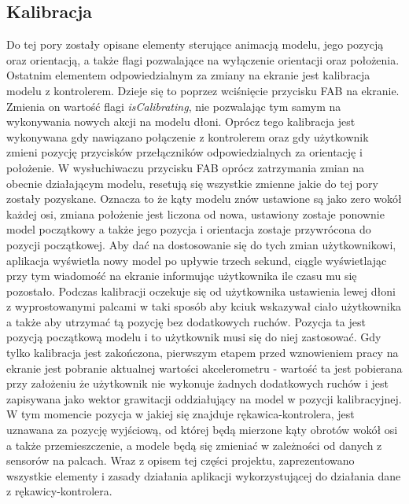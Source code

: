 	\subsection{Kalibracja}
	\label{subsec:kalibracja}
	Do tej pory zostały opisane elementy sterujące animacją modelu, jego pozycją oraz orientacją, a także flagi pozwalające na wyłączenie orientacji oraz położenia. Ostatnim elementem odpowiedzialnym za zmiany na ekranie jest kalibracja modelu z kontrolerem. Dzieje się to poprzez wciśnięcie przycisku FAB na ekranie. Zmienia on wartość flagi \textit{isCalibrating}, nie pozwalając tym samym na wykonywania nowych akcji na modelu dłoni. Oprócz tego kalibracja jest wykonywana gdy nawiązano połączenie z kontrolerem oraz gdy użytkownik zmieni pozycję przycisków przełączników odpowiedzialnych za orientację i położenie. W wysłuchiwaczu przycisku FAB oprócz zatrzymania zmian na obecnie działającym modelu, resetują się wszystkie zmienne jakie do tej pory zostały pozyskane. Oznacza to że kąty modelu znów ustawione są jako zero wokół każdej osi, zmiana położenie jest liczona od nowa, ustawiony zostaje ponownie model początkowy a także jego pozycja i orientacja zostaje przywrócona do pozycji początkowej. Aby dać na dostosowanie się do tych zmian użytkownikowi, aplikacja wyświetla nowy model po upływie trzech sekund, ciągle wyświetlając przy tym wiadomość na ekranie informując użytkownika ile czasu mu się pozostało. Podczas kalibracji oczekuje się od użytkownika ustawienia lewej dłoni z wyprostowanymi palcami w taki sposób aby kciuk wskazywał ciało użytkownika a także aby utrzymać tą pozycję bez dodatkowych ruchów. Pozycja ta jest pozycją początkową modelu i to użytkownik musi się do niej zastosować. Gdy tylko kalibracja jest zakończona, pierwszym etapem przed wznowieniem pracy na ekranie jest pobranie aktualnej wartości akcelerometru - wartość ta jest pobierana przy założeniu że użytkownik nie wykonuje żadnych dodatkowych ruchów i jest zapisywana jako wektor grawitacji oddziałujący na model w pozycji kalibracyjnej. W tym momencie pozycja w jakiej się znajduje rękawica-kontrolera, jest uznawana za pozycję wyjściową, od której będą mierzone kąty obrotów wokół osi a także przemieszczenie, a modele będą się zmieniać w zależności od danych z sensorów na palcach. Wraz z opisem tej części projektu, zaprezentowano wszystkie elementy i zasady działania aplikacji wykorzystującej do działania dane z rękawicy-kontrolera.
	
	


